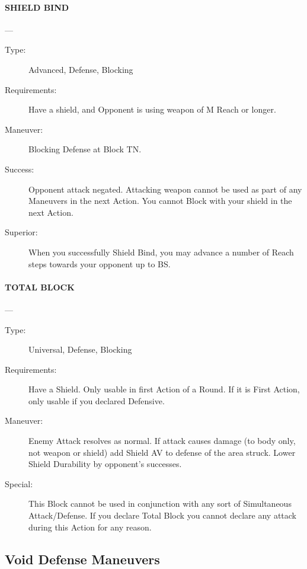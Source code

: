 \documentclass[oneside,11pt,english]{book}
\begin{document}
\paragraph{\large\label{man:SHIELD BIND} SHIELD BIND}---\quad{\large[X+1]}
\vspace{-10pt}\begin{description} 
\item [Type:] Advanced, Defense, Blocking 
\item [Requirements:] Have a shield, and Opponent is using weapon of M Reach or longer. 
\item [Maneuver:] Blocking Defense at Block TN. 
\item [Success:] Opponent attack negated. Attacking weapon cannot be used as part of any Maneuvers in the next 
Action. You cannot Block with your shield in the next Action. 
\item [Superior:] When you successfully Shield Bind, you may advance a number of Reach steps towards your 
opponent up to BS. 
\end{description}
\paragraph{\large\label{man:TOTAL BLOCK} TOTAL BLOCK}---
\vspace{-10pt}\begin{description} 
\item [Type:] Universal, Defense, Blocking 
\item [Requirements:] Have a Shield. Only usable in first Action of a Round. If it is First Action, only usable if 
you declared Defensive. 
\item [Maneuver:] Enemy Attack resolves as normal. If attack causes damage (to body only, not weapon or 
shield) add Shield AV to defense of the area struck. 
Lower Shield Durability by opponent’s successes. 
\item [Special:] This Block cannot be used in conjunction with any sort of Simultaneous Attack/Defense. If you 
declare Total Block you cannot declare any attack during this Action for any reason. 
\end{description}
\subsection{Void Defense Maneuvers}
\end{document}
